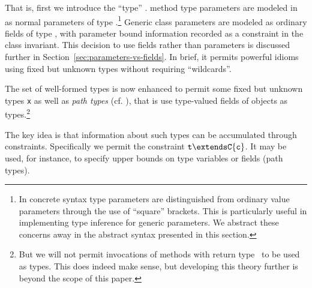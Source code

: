 That is, first we introduce the ``type'' \type. \FGJ{} method type
parameters are modeled in \FXG{} as normal parameters of type
\type.\footnote{In concrete \Xten{} syntax type parameters are
distinguished from ordinary value parameters through the use of
``square'' brackets. This is particularly useful in implementing type
inference for generic parameters. We abstract these concerns away in
the abstract syntax presented in this section.}  Generic class
parameters are modeled as ordinary fields of type \type, with
parameter bound information recorded as a constraint in the class
invariant. This decision to use fields rather than parameters is
discussed further in Section~\ref{sec:parameters-vs-fields}. In brief,
it permits powerful idioms using fixed but unknown types without
requiring ``wildcards''.

The set of well-formed types is now enhanced to permit some fixed but unknown
types {\tt x} as well as \emph{path types} (cf. \cite{scala}), that is use type-valued fields of objects as types.\footnote{But we will not permit invocations of methods with return type \type\ to be 
used as types. This does indeed make sense, but developing
this theory further is beyond the scope of this paper.}

The key idea is that information about such types can
be accumulated through constraints.  Specifically we
permit the constraint ${\tt t \extends C\{c\}}$. It may be used, for
instance, to specify upper bounds on type variables or fields (path
types).


